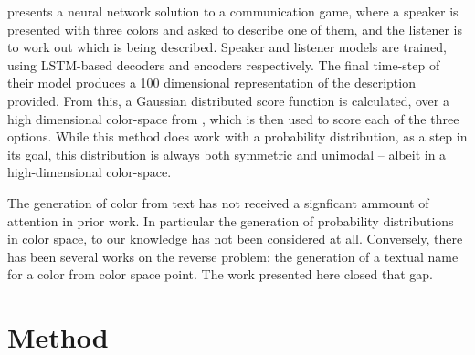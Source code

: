 \documentclass[11pt,a4paper]{article}
\newcommand{\textcite}{\citet}
\begin{document}
\textcite{DBLP:journals/corr/MonroeHGP17} presents a neural network solution to a communication game, where a speaker is presented with three colors and asked to describe one of them, and the listener is to work out which is being described.
Speaker and listener models are trained, using LSTM-based decoders and encoders respectively.
The final time-step of their model produces a 100 dimensional representation of the description provided.
From this, a Gaussian distributed score function is calculated, over a high dimensional color-space from \textcite{2016arXiv160603821M}, which is then used to score each of the three options.
While this method does work with a probability distribution, as a step in its goal,
this distribution is always both symmetric and unimodal -- albeit in a high-dimensional color-space.

The generation of color from text has not received a signficant ammount of attention in prior work.
In particular the generation of probability distributions in color space, to our knowledge has not been considered at all.
Conversely, there has been several works on the reverse problem: the generation of a textual name for a color from color space point.
The work presented here closed that gap.




\section{Method}
\end{document}
